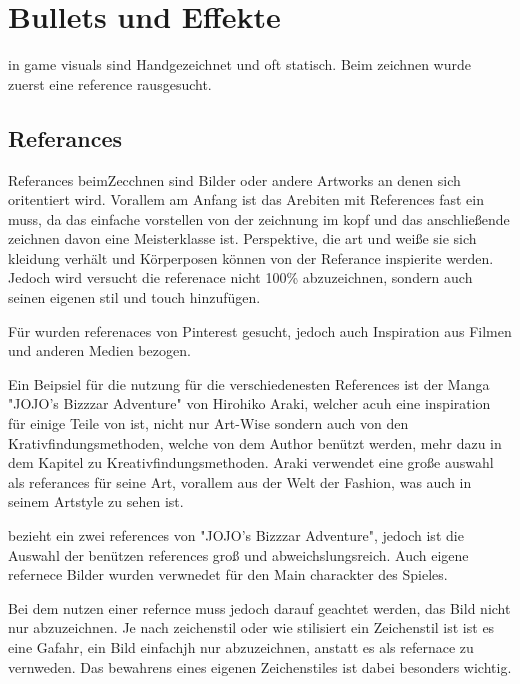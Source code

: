 
\section{Bullets und Effekte}\label{sec:bullets-und-effekte}

\renewcommand{\kapitelautor}{Autor: Irgendwer} %


\FF in game visuals sind Handgezeichnet und oft statisch. Beim zeichnen wurde zuerst eine reference rausgesucht.


\subsection{Referances}\label{subsec:references}
Referances beimZecchnen sind Bilder oder andere Artworks an denen sich oritentiert wird. Vorallem am Anfang ist das
Arebiten mit References fast ein muss, da das einfache vorstellen von der zeichnung im kopf und das anschließende zeichnen davon eine Meisterklasse ist.
Perspektive, die art und weiße sie sich kleidung verhält und Körperposen können von der Referance inspierite werden.
Jedoch wird versucht die referenace nicht 100\% abzuzeichnen, sondern auch seinen eigenen stil und touch hinzufügen. \cite{referance}


Für \FF wurden referenaces von Pinterest gesucht, jedoch auch Inspiration aus Filmen und anderen Medien bezogen.


Ein Beipsiel für die nutzung für die verschiedenesten References ist der Manga "JOJO's Bizzzar Adventure" von Hirohiko Araki\cite{jojo},
welcher acuh eine inspiration für einige Teile von \FF ist, nicht nur Art-Wise sondern auch von den Krativfindungsmethoden, welche von dem Author benützt werden, mehr dazu in dem
Kapitel zu Kreativfindungsmethoden. %
Araki verwendet eine große auswahl als referances für seine Art, vorallem aus der Welt
der Fashion, was auch in seinem Artstyle zu sehen ist.


\FF bezieht ein zwei references von "JOJO's Bizzzar Adventure", jedoch ist die Auswahl der benützen references groß und abweichslungsreich.
Auch eigene refernece Bilder wurden verwnedet für den Main charackter des Spieles.


Bei dem nutzen einer refernce muss jedoch darauf geachtet werden, das Bild nicht nur abzuzeichnen. Je nach zeichenstil
oder wie stilisiert ein Zeichenstil ist ist es eine Gafahr, ein  Bild einfachjh nur abzuzeichnen, anstatt es als refernace zu vernweden.
Das bewahrens eines eigenen Zeichenstiles ist dabei besonders wichtig.


